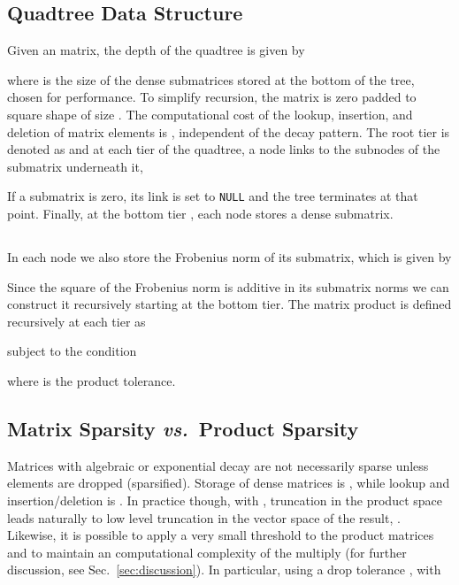 \subsection{Quadtree Data Structure}
\label{sec:quadtree}

Given an  matrix, the depth of the quadtree is given by

where  is the size of the dense submatrices stored at the
bottom of the tree, chosen for performance.  To simplify recursion, the matrix
is zero padded to square shape of size . The
computational cost of the lookup, insertion, and deletion of matrix elements
is , independent of the decay pattern.
The root tier is denoted as  and at each tier  of the quadtree,
a node links to the subnodes of the  submatrix underneath it,

If a submatrix is zero, its link is set to {\tt NULL} and the tree terminates
at that point.  Finally, at the bottom tier , each node stores a dense
 submatrix.

\subsection{\SpAMM{}}
\label{sec:spamm}

In each node we also store the Frobenius norm of its submatrix, which is given
by

Since the square of the Frobenius norm is additive in its submatrix norms we
can construct it recursively starting at the bottom tier. The matrix product is
defined recursively at each tier as

subject to the \SpAMM{} condition

where  is the \SpAMM{} product tolerance.

\subsection{Matrix Sparsity \emph{vs.}~Product Sparsity}

Matrices with algebraic or exponential decay are not necessarily sparse unless
elements are dropped (sparsified). Storage of dense matrices is , while lookup and insertion/deletion is . In practice though, with , truncation in the
product space leads naturally to low level truncation in the vector space of
the result, .  Likewise, it is possible to apply a very small threshold to
the product matrices  and  to maintain an  computational complexity of the multiply (for further discussion, see
Sec.~\ref{sec:discussion}). In particular, using a drop tolerance ,
with

